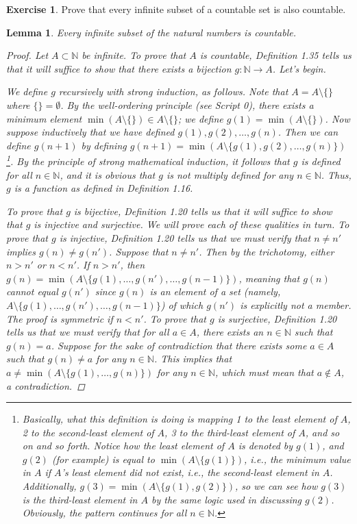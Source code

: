 \documentclass[titlepage]{article}
\newcounter{script}
\newtheorem*{lemma*}{Lemma}
\theoremstyle{definition}
\newtheorem{exercise}{Exercise}[script]
\newcommand{\N}{\mathbb{N}}
\begin{document}
\begin{exercise}
    Prove that every infinite subset of a countable set is also countable.
    \begin{lemma*}
        Every infinite subset of the natural numbers is countable.
        \begin{proof}
            Let $A\subset\N$ be infinite. To prove that $A$ is countable, Definition 1.35 tells us that it will suffice to show that there exists a bijection $g:\N\to A$. Let's begin.\par
            We define $g$ recursively with strong induction, as follows. Note that $A=A\setminus\{\}$ where $\{\}=\emptyset$. By the well-ordering principle (see Script 0), there exists a minimum element $\min(A\setminus\{\})\in A\setminus\{\}$; we define $g(1)=\min(A\setminus\{\})$. Now suppose inductively that we have defined $g(1),g(2),\dots,g(n)$. Then we can define $g(n+1)$ by defining $g(n+1)=\min(A\setminus\{g(1),g(2),\dots,g(n)\})$\footnote{Basically, what this definition is doing is mapping 1 to the least element of $A$, 2 to the second-least element of $A$, 3 to the third-least element of $A$, and so on and so forth. Notice how the least element of $A$ is denoted by $g(1)$, and $g(2)$ (for example) is equal to $\min(A\setminus\{g(1)\})$, i.e., the minimum value in $A$ if $A$'s least element did not exist, i.e., the second-least element in $A$. Additionally, $g(3)=\min(A\setminus\{g(1),g(2)\})$, so we can see how $g(3)$ is the third-least element in $A$ by the same logic used in discussing $g(2)$. Obviously, the pattern continues for all $n\in\N$.}. By the principle of strong mathematical induction, it follows that $g$ is defined for all $n\in\N$, and it is obvious that $g$ is not multiply defined for any $n\in\N$. Thus, $g$ is a function as defined in Definition 1.16.\par
            To prove that $g$ is bijective, Definition 1.20 tells us that it will suffice to show that $g$ is injective and surjective. We will prove each of these qualities in turn. To prove that $g$ is injective, Definition 1.20 tells us that we must verify that $n\neq n'$ implies $g(n)\neq g(n')$. Suppose that $n\neq n'$. Then by the trichotomy, either $n>n'$ or $n<n'$. If $n>n'$, then $g(n)=\min(A\setminus\{g(1),\dots,g(n'),\dots,g(n-1)\})$, meaning that $g(n)$ cannot equal $g(n')$ since $g(n)$ is an element of a set (namely, $A\setminus\{g(1),\dots,g(n'),\dots,g(n-1)\}$) of which $g(n')$ is explicitly not a member. The proof is symmetric if $n<n'$. To prove that $g$ is surjective, Definition 1.20 tells us that we must verify that for all $a\in A$, there exists an $n\in\N$ such that $g(n)=a$. Suppose for the sake of contradiction that there exists some $a\in A$ such that $g(n)\neq a$ for any $n\in\N$. This implies that $a\neq\min(A\setminus\{g(1),\dots,g(n)\})$ for any $n\in\N$, which must mean that $a\notin A$, a contradiction.

\end{proof}
\end{lemma*}
\end{exercise}
\end{document}
